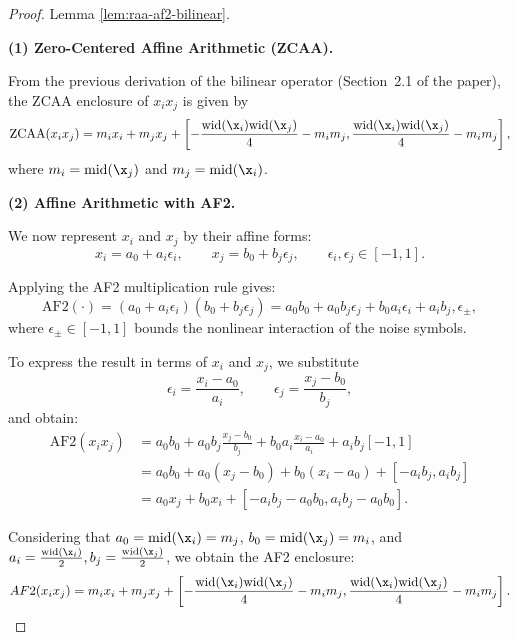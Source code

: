 \documentclass[10pt]{article}
\begin{document}
\begin{proof} Lemma \ref{lem:raa-af2-bilinear}.

\noindent
\textbf{(1) Zero-Centered Affine Arithmetic (ZCAA).}

From the previous derivation of the bilinear operator (Section~2.1 of the paper), the ZCAA enclosure of $x_i x_j$ is given by
\[
\mathrm{ZCAA}(x_i x_j)
= m_i x_i + m_j x_j
+ \left[
  -\frac{\mathrm{wid}(\x_i)\mathrm{wid}(\x_j)}{4} - m_i m_j,
  \frac{\mathrm{wid}(\x_i)\mathrm{wid}(\x_j)}{4} - m_i m_j
  \right],
  \]
  where $m_i = \mathrm{mid}(\x_j)$ and $m_j = \mathrm{mid}(\x_i)$.

\noindent
\textbf{(2) Affine Arithmetic with AF2.}

We now represent $x_i$ and $x_j$ by their affine forms:
\[
x_i = a_0 + a_i \epsilon_i,
\qquad
x_j = b_0 + b_j \epsilon_j,
\qquad
\epsilon_i, \epsilon_j \in [-1,1].
\]

Applying the AF2 multiplication rule gives:
\[
\mathrm{AF2}(\cdot)
= (a_0 + a_i \epsilon_i)(b_0 + b_j \epsilon_j)
= a_0 b_0 + a_0 b_j \epsilon_j + b_0 a_i \epsilon_i + a_i b_j,\epsilon_{\pm},
\]
where $\epsilon_{\pm} \in [-1,1]$ bounds the nonlinear interaction of the noise symbols.

To express the result in terms of $x_i$ and $x_j$, we substitute
\[
\epsilon_i = \frac{x_i - a_0}{a_i},
\qquad
\epsilon_j = \frac{x_j - b_0}{b_j},
\]
and obtain:
\begin{align*}
\mathrm{AF2}(x_i x_j)
&= a_0 b_0 + a_0 b_j \frac{x_j - b_0}{b_j} + b_0 a_i \frac{x_i - a_0}{a_i} + a_i b_j [-1,1] \\
  &= a_0 b_0 + a_0 (x_j - b_0) + b_0 (x_i - a_0) +  [-a_i b_j,a_i b_j] \\
  &= a_0 x_j + b_0 x_i + [-a_i b_j - a_0 b_0,a_i b_j - a_0 b_0].
  \end{align*}

Considering that $a_0 = \mathrm{mid}(\x_i) = m_j$,
$b_0 = \mathrm{mid}(\x_j) = m_i$,
and $a_i = \tfrac{\mathrm{wid}(\x_i)}{2}, b_j = \tfrac{\mathrm{wid}(\x_j)}{2}$,
we obtain the AF2 enclosure:
\[
AF2(x_i x_j)
= m_i x_i + m_j x_j
+ \left[
  -\frac{\mathrm{wid}(\x_i)\mathrm{wid}(\x_j)}{4} - m_i m_j,
  \frac{\mathrm{wid}(\x_i)\mathrm{wid}(\x_j)}{4} - m_i m_j
  \right].
  \]

\end{proof}
\end{document}
